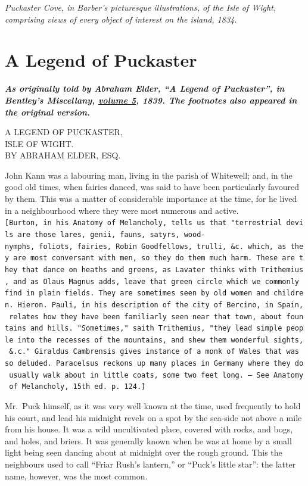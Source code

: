 \documentclass[
  12pt,
  a5paper,
  twoside]{book}
\let\oldtexttt\texttt        %
\renewcommand{\texttt}[1]{{\footnotesize\oldtexttt{#1}}}
\begin{document}
\emph{Puckaster Cove, in Barber's picturesque illustrations, of the Isle
of Wight, comprising views of every object of interest on the island,
1834.}


\chapter{A Legend of Puckaster}\label{a-legend-of-puckaster}

\textbf{\emph{As originally told by Abraham Elder, ``A Legend of
Puckaster'', in Bentley's Miscellany,
\href{https://archive.org/details/sim_bentleys-miscellany_1839-07_6/page/368/mode/2up}{volume
5}, 1839. The footnotes also appeared in the original version.}}

A LEGEND OF PUCKASTER,\\
ISLE OF WIGHT.\\
BY ABRAHAM ELDER, ESQ.

John Kann was a labouring man, living in the parish of Whitewell; and,
in the good old times, when fairies danced, was said to have been
particularly favoured by them. This was a matter of considerable
importance at the time, for he lived in a neighbourhood where they were
most numerous and active.
\texttt{{[}Burton,\ in\ his\ Anatomy\ of\ Melancholy,\ tells\ us\ that\ "terrestrial\ devils\ are\ those\ lares,\ genii,\ fauns,\ satyrs,\ wood-nymphs,\ foliots,\ fairies,\ Robin\ Goodfellows,\ trulli,\ \&c.\ which,\ as\ they\ are\ most\ conversant\ with\ men,\ so\ they\ do\ them\ much\ harm.\ These\ are\ they\ that\ dance\ on\ heaths\ and\ greens,\ as\ Lavater\ thinks\ with\ Trithemius,\ and\ as\ Olaus\ Magnus\ adds,\ leave\ that\ green\ circle\ which\ we\ commonly\ find\ in\ plain\ fields.\ They\ are\ sometimes\ seen\ by\ old\ women\ and\ children.\ Hieron.\ Pauli,\ in\ his\ description\ of\ the\ city\ of\ Bercino,\ in\ Spain,\ relates\ how\ they\ have\ been\ familiarly\ seen\ near\ that\ town,\ about\ fountains\ and\ hills.\ "Sometimes,"\ saith\ Trithemius,\ "they\ lead\ simple\ people\ into\ the\ recesses\ of\ the\ mountains,\ and\ shew\ them\ wonderful\ sights,\ \&.c."\ Giraldus\ Cambrensis\ gives\ instance\ of\ a\ monk\ of\ Wales\ that\ was\ so\ deluded.\ Paracelsus\ reckons\ up\ many\ places\ in\ Germany\ where\ they\ do\ usually\ walk\ about\ in\ little\ coats,\ some\ two\ feet\ long.\ —\ See\ Anatomy\ of\ Melancholy,\ 15th\ ed.\ p.\ 124.{]}}

Mr.~Puck himself, as it was very well known at the time, used frequently
to hold his court, and lead his midnight revels on a spot by the
sea-side not above a mile from his house. It was a wild uncultivated
place, covered with rocks, and bogs, and holes, and briers. It was
generally known when he was at home by a small light being seen dancing
about at midnight over the rough ground. This the neighbours used to
call ``Friar Rush's lantern,'' or ``Puck's little star'': the latter
name, however, was the most common.
\end{document}
